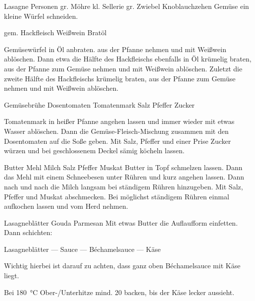 \begin{MyRecipe}{Lasagne}{ Personen}{}
	\ingredient[\Calc{1}{\x}]{} {gr. Möhre}
	\ingredient[\Calc{0.5}{\x}]{} {kl. Sellerie}
	\ingredient[\Calc{1}{\x}]{} {gr. Zwiebel}
	\ingredient[\Calc{2}{\x}]{} {Knoblauchzehen}
	Gemüse ein kleine Würfel schneiden.\par\bigskip
	
	
	\ingredient[\Calc{0.6}{\x}]{\si{\kilogram}} {gem. Hackfleisch}
	\ingredient[\Calc{0.2}{\x}]{\si{\liter}} {Weißwein}
	\ingredient[]{} {Bratöl}
	
	Gemüsewürfel in Öl anbraten. aus der Pfanne nehmen und mit Weißwein ablöschen. Dann etwa die Hälfte des Hackfleischs ebenfalls in Öl krümelig braten, aus der Pfanne zum Gemüse nehmen und mit Weißwein ablöschen. Zuletzt die zweite Hälfte des Hackfleischs krümelig braten, aus der Pfanne zum Gemüse nehmen und mit Weißwein ablöschen.\par\bigskip
	

	\ingredient[\Calc{0.5}{\x}]{\si{\liter}} {Gemüsebrühe}
	\ingredient[\Calc{0.4}{\x}]{\si{\kilogram}} {Dosentomaten}
	 {Tomatenmark}
	\ingredient[]{} {Salz}
	\ingredient[]{} {Pfeffer}
	\ingredient[]{} {Zucker}
	
	Tomatenmark in heißer Pfanne angehen lassen und immer wieder mit etwas Wasser ablöschen. Dann die Gemüse-Fleisch-Mischung zusammen mit den Dosentomaten auf die Soße geben. Mit Salz, Pfeffer und einer Prise Zucker würzen und bei geschlossenem Deckel sämig köcheln lassen.\par\bigskip
	
	 {Butter}
	 {Mehl}
	\ingredient[\Calc{0.5}{\x}]{\si{\liter}} {Milch}
	\ingredient[]{} {Salz}
	\ingredient[]{} {Pfeffer}
	\ingredient[]{} {Muskat}
	Butter in Topf schmelzen lassen. Dann das Mehl mit einem Schneebesen unter Rühren und kurz angehen lassen. Dann nach und nach die Milch langsam bei ständigem Rühren hinzugeben. Mit Salz, Pfeffer und Muskat abschmecken. Bei möglichst ständigem Rühren einmal aufkochen lassen und vom Herd nehmen.
	
	\ingredient[\Calc{12}{\x}]{} {Lasagneblätter}
	\ingredient[\Calc{0.3}{\x}]{\si{\kilogram}} {Gouda}
	\ingredient[\Calc{0.1}{\x}]{\si{\kilogram}} {Parmesan}
	Mit etwas Butter die Auflaufform einfetten. Dann schichten:\par
	Lasagneblätter --- Sauce --- Béchamelsauce --- Käse\par
	Wichtig hierbei ist darauf zu achten, dass ganz oben Béchamelsauce mit Käse liegt.\par\bigskip

	Bei \SI{180}{\degreeCelsius} Ober-/Unterhitze mind. \SI{20}{\minuteprime} backen, bis der Käse lecker aussieht.
	
	
	
\end{MyRecipe}